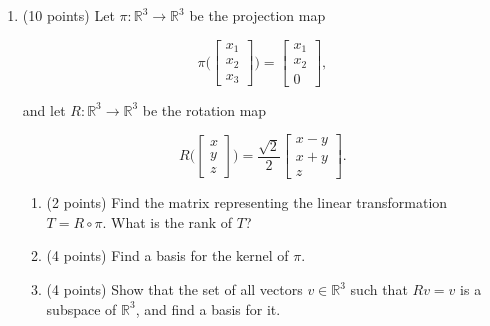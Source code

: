 \documentclass[12 pt]{report}
\begin{document}
\begin{enumerate}
\item (10 points) Let $\pi: \mathbb{R}^3 \to \mathbb{R}^3$ be the projection map

\[
\pi\Big(\begin{bmatrix} x_1 \\ x_2 \\ x_3 \end{bmatrix} \Big) = \begin{bmatrix} x_1 \\ x_2 \\ 0 \end{bmatrix},
\]

and let $R:\mathbb{R}^3 \to \mathbb{R}^3$ be the rotation map 

\[
R \Big(\begin{bmatrix} x \\ y \\ z \end{bmatrix} \Big) = \frac{\sqrt{2}}{2} \begin{bmatrix} x-y \\ x+y \\ z \end{bmatrix}.
\]

\begin{enumerate} \item (2 points) Find the matrix representing the linear transformation $T = R \circ \pi$. What is the rank of $T$?
\vfill
\item (4 points) Find a basis for the kernel of $\pi$. 
\vfill
\item (4 points) Show that the set of all vectors $v \in \mathbb{R}^3$ such that $Rv = v$ is a subspace of $\mathbb{R}^3$, and find a basis for it.
\vfill
\end{enumerate}


\end{enumerate}
\end{document}
